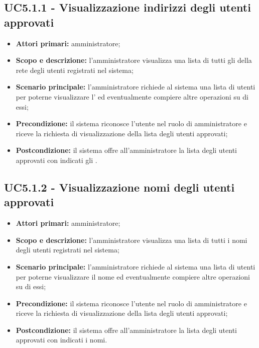 \documentclass[AnalisiDeiRequisiti.tex]{subfiles}
\begin{document}
\subsection{UC5.1.1 - Visualizzazione indirizzi degli utenti approvati}
\begin{itemize}
	\item \textbf{Attori primari:} amministratore;
	\item \textbf{Scopo e descrizione:} l'amministratore visualizza una lista di tutti gli  della rete  degli utenti registrati nel sistema;
	\item \textbf{Scenario principale:} l'amministratore richiede al sistema una lista di utenti per poterne visualizzare l' ed eventualmente compiere altre operazioni su di essi;
	\item \textbf{Precondizione:} il sistema riconosce l'utente nel ruolo di amministratore e riceve la richiesta di visualizzazione della lista degli utenti approvati;
	\item \textbf{Postcondizione:} il sistema offre all'amministratore la lista degli utenti approvati con indicati gli .
\end{itemize}
\subsection{UC5.1.2 - Visualizzazione nomi degli utenti approvati}
\begin{itemize}
	\item \textbf{Attori primari:} amministratore;
	\item \textbf{Scopo e descrizione:} l'amministratore visualizza una lista di tutti i nomi degli utenti registrati nel sistema;
	\item \textbf{Scenario principale:} l'amministratore richiede al sistema una lista di utenti per poterne visualizzare il nome ed eventualmente compiere altre operazioni su di essi;
	\item \textbf{Precondizione:} il sistema riconosce l'utente nel ruolo di amministratore e riceve la richiesta di visualizzazione della lista degli utenti approvati;
	\item \textbf{Postcondizione:} il sistema offre all'amministratore la lista degli utenti approvati con indicati i nomi.
\end{itemize}
\end{document}
